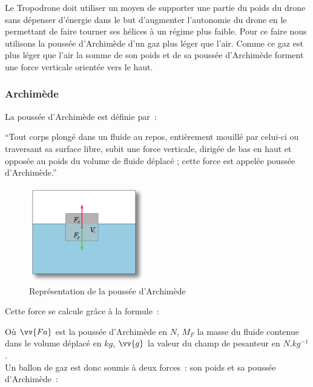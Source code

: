 \documentclass[a4paper,11pt]{article}
\begin{document}
Le Tropodrone doit utiliser un moyen de supporter une partie du poids du drone sans dépenser d'énergie dans le but d'augmenter l'autonomie du drone en le permettant de faire tourner ses hélices à un régime plus faible. Pour ce faire nous utilisons la poussée d'Archimède d'un gaz plus léger que l'air. Comme ce gaz est plus léger que l'air la somme de son poids et de sa poussée d'Archimède forment une force verticale orientée vers le haut.

\subsubsection{Archimède}

La poussée d'Archimède est définie par~:

\enquote{Tout corps plongé dans un fluide au repos, entièrement mouillé par celui-ci ou traversant sa surface libre, subit une force verticale, dirigée de bas en haut et opposée au poids du volume de fluide déplacé ; cette force est appelée poussée d'Archimède.}

\begin{figure}[H]
	\centering
	\includegraphics[width=5cm]{../Images/pousse_archimede.png}
	\caption{Représentation de la poussée d'Archimède}
\end{figure}

Cette force se calcule grâce à la formule~:

\begin{center}
\end{center}

Où $\vv{Fa}$ est la poussée d'Archimède en $N$, $M_F$ la masse du fluide contenue dans le volume déplacé en $kg$, $\vv{g}$ la valeur du champ de pesanteur en $N.kg^{-1}$. \\

Un ballon de gaz est donc soumis à deux forces~: son poids et sa poussée d'Archimède~:

\begin{center}
\end{center}
\end{document}
